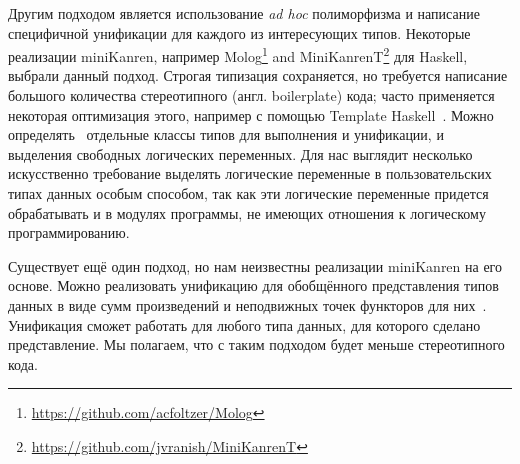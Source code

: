 Другим подходом является использование \emph{ad hoc} полиморфизма и написание специфичной унификации для каждого из интересующих типов.
Некоторые реализации miniKanren, например  Molog\footnote{\url{https://github.com/acfoltzer/Molog}} and
MiniKanrenT\footnote{\url{https://github.com/jvranish/MiniKanrenT}} для Haskell, выбрали данный подход.
Строгая типизация сохраняется, но требуется написание большого количества стереотипного (англ. boilerplate) кода; часто применяется некоторая оптимизация этого, например с помощью
Template Haskell~\cite{SheardTMH}.
Можно определять~\cite{TypedLogicalVariables} отдельные классы типов для выполнения и унификации, и выделения свободных логических переменных. %
Для нас выглядит несколько искусственно требование выделять логические переменные в пользовательских типах данных особым способом, так как эти логические переменные придется обрабатывать и в модулях программы, не имеющих отношения к логическому программированию.


Существует ещё один подход, но нам неизвестны реализации miniKanren  на его основе.
Можно реализовать унификацию для обобщённого представления типов данных в виде сумм произведений и неподвижных точек функторов для них~\cite{InstantGenerics, ALaCarte}.
Унификация сможет работать для любого типа данных, для которого сделано представление.
Мы полагаем, что с таким подходом будет меньше стереотипного кода.

\def\adhoc{\emph{ad hoc}}

